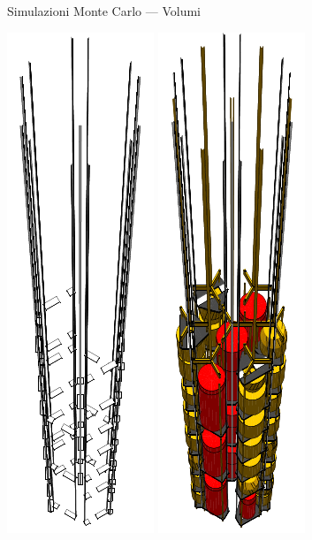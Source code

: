 \documentclass[10pt]{beamer}
\begin{document}
\begin{frame}[plain,c,label=27]{Simulazioni Monte Carlo --- Volumi}
\begin{center}
{		\includegraphics{../img/cables.pdf}%
		\includegraphics{../img/all.pdf}%
	}%
	\end{center}
\end{frame}
\end{document}
